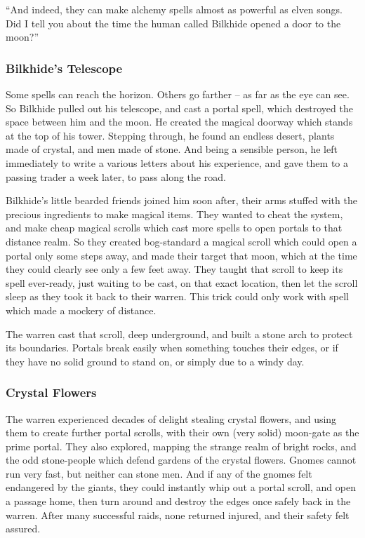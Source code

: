 \begin{multicols}{2}
\begin{exampletext}
  ``And indeed, they can make alchemy spells almost as powerful as elven songs.
  Did I tell you about the time the human called Bilkhide opened a door to the moon?''
\end{exampletext}

\subsubsection{Bilkhide's Telescope}

Some spells can reach the horizon.
Others go farther -- as far as the eye can see.
So Bilkhide pulled out his telescope, and cast a portal spell, which destroyed the space between him and the moon.
He created the magical doorway which stands at the top of his tower.
Stepping through, he found an endless desert, plants made of crystal, and men made of stone.
And being a sensible person, he left immediately to write a various letters about his experience, and gave them to a passing trader a week later, to pass along the road.

Bilkhide's little bearded friends joined him soon after, their arms stuffed with the precious ingredients to make magical items.
They wanted to cheat the system, and make cheap magical scrolls which cast more spells to open portals to that distance realm.
So they created bog-standard a magical scroll which could open a portal only some steps away, and made their target that moon, which at the time they could clearly see only a few feet away.
They taught that scroll to keep its spell ever-ready, just waiting to be cast, on that exact location, then let the scroll sleep as they took it back to their warren.
This trick could only work with spell which made a mockery of distance.

The warren cast that scroll, deep underground, and built a stone arch to protect its boundaries.
Portals break easily when something touches their edges, or if they have no solid ground to stand on, or simply due to a windy day.

\subsubsection{Crystal Flowers}

The warren experienced decades of delight stealing crystal flowers, and using them to create further portal scrolls, with their own (very solid) moon-gate as the prime portal.
They also explored, mapping the strange realm of bright rocks, and the odd stone-people which defend gardens of the crystal flowers.
Gnomes cannot run very fast, but neither can stone men.
And if any of the gnomes felt endangered by the giants, they could instantly whip out a portal scroll, and open a passage home, then turn around and destroy the edges once safely back in the warren.
After many successful raids, none returned injured, and their safety felt assured.


\end{multicols}
